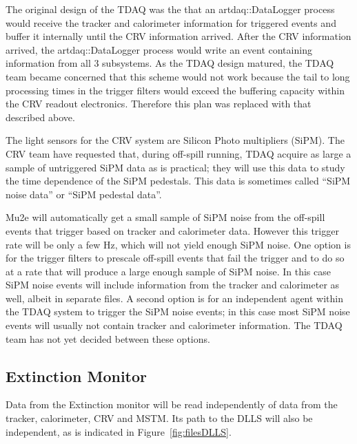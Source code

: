 \begin{sloppypar}
The original design of the TDAQ was the that an {\code artdaq::DataLogger} process
would receive the tracker and calorimeter information for triggered events
and buffer it internally until the CRV information arrived.
After the CRV information arrived,
the {\code artdaq::DataLogger} process would write an event containing information from all 3 subsystems.
As the TDAQ design matured, the TDAQ team became concerned that this scheme would not work because
the tail to long processing times in the trigger filters would exceed the buffering capacity within
the CRV readout electronics.
Therefore this plan was replaced with that described above.
\end{sloppypar}

The light sensors for the CRV system are Silicon Photo multipliers (SiPM).
The CRV team have requested that, during off-spill running,
TDAQ acquire as large a sample of untriggered SiPM data as is practical;
they will use this data to study the time dependence of the SiPM pedestals.
This data is sometimes called ``SiPM noise data'' or ``SiPM pedestal data''.

Mu2e will automatically get a small sample of SiPM noise from the off-spill events
that trigger based on tracker and calorimeter data.
However this trigger rate will be only a few Hz, which will not yield enough SiPM noise.
One option is for the trigger filters to prescale off-spill events that fail the trigger
and to do so at a rate that will produce a large enough sample of SiPM noise.
In this case SiPM noise events will include information from the tracker and calorimeter as well,
albeit in separate files.
A second option is for an independent agent within the TDAQ system to trigger the SiPM noise events;
in this case most SiPM noise events will usually not contain tracker and calorimeter information.
The TDAQ team has not yet decided between these options.


\subsection{Extinction Monitor}
\label{ssec:ExtMon}

Data from the Extinction monitor will be read independently of data
from the tracker, calorimeter, CRV and MSTM.
Its path to the DLLS will also be independent, as is indicated in Figure~\ref{fig:filesDLLS}.

